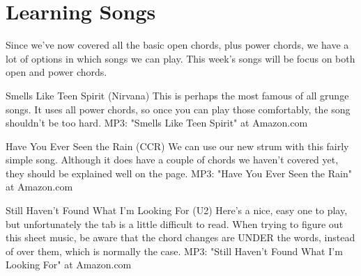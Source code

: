 \section{Learning Songs}
Since we've now covered all the basic open chords, plus power chords, we have a lot of options in which songs we can play. This week's songs will be focus on both open and power chords.

Smells Like Teen Spirit (Nirvana)
This is perhaps the most famous of all grunge songs. It uses all power chords, so once you can play those comfortably, the song shouldn't be too hard.
MP3: "Smells Like Teen Spirit" at Amazon.com

Have You Ever Seen the Rain (CCR)
We can use our new strum with this fairly simple song. Although it does have a couple of chords we haven't covered yet, they should be explained well on the page.
MP3: "Have You Ever Seen the Rain" at Amazon.com

Still Haven't Found What I'm Looking For (U2)
Here's a nice, easy one to play, but unfortunately the tab is a little difficult to read. When trying to figure out this sheet music, be aware that the chord changes are UNDER the words, instead of over them, which is normally the case. MP3: "Still Haven't Found What I'm Looking For" at Amazon.com 

